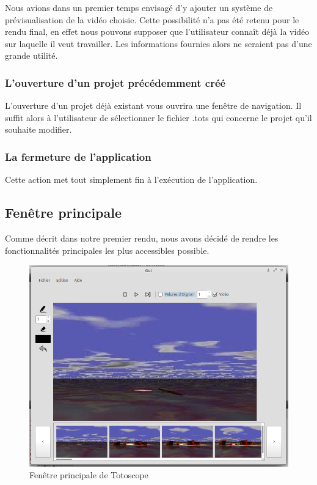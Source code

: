 	Nous avions dans un premier temps envisagé d'y ajouter un système de prévisualisation de la vidéo choisie. Cette possibilité n'a pas été retenu pour le rendu final, en effet nous pouvons supposer que l'utilisateur connaît déjà la vidéo sur laquelle il veut travailler. Les informations fournies alors ne seraient pas d'une grande utilité.
			
	\subsubsection*{L'ouverture d'un projet précédemment créé}
			L'ouverture d'un projet déjà existant vous ouvrira une fenêtre de navigation. Il suffit alors à l'utilisateur de sélectionner le fichier .tots qui concerne le projet qu'il souhaite modifier.
						
	\subsubsection*{La fermeture de l'application}
			Cette action met tout simplement fin à l'exécution de l'application.			

\subsection{Fenêtre principale}
	Comme décrit dans notre premier rendu, nous avons décidé de rendre les fonctionnalités principales les plus accessibles possible. 
	
	\begin{figure}[!h]
		\centering
		\includegraphics[scale=0.5]{./figures/gui.png}
		\caption{Fenêtre principale de Totoscope}
	\end{figure}

